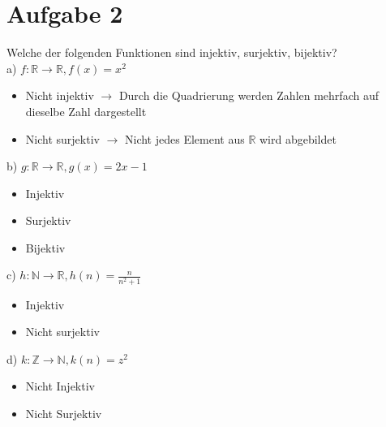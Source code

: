 \section*{Aufgabe 2}

Welche der folgenden Funktionen sind injektiv, surjektiv, bijektiv?\\

a) $f : \mathbb{R} \rightarrow \mathbb{R}, f(x) = x^2$

\begin{itemize}
\item Nicht injektiv $\rightarrow$ Durch die Quadrierung werden Zahlen mehrfach auf dieselbe Zahl dargestellt
\item Nicht surjektiv $\rightarrow$ Nicht jedes Element aus $\mathbb{R}$ wird abgebildet
\end{itemize}

b) $g: \mathbb{R} \rightarrow \mathbb{R}, g(x) = 2x - 1$

\begin{itemize}
\item Injektiv
\item Surjektiv
\item Bijektiv
\end{itemize}

c) $h: \mathbb{N} \rightarrow \mathbb{R}, h(n) = \frac{n}{n^2 + 1}$

\begin{itemize}
\item Injektiv
\item Nicht surjektiv
\end{itemize}

d) $k: \mathbb{Z} \rightarrow \mathbb{N}, k(n) = z^2$

\begin{itemize}
\item Nicht Injektiv
\item Nicht Surjektiv
\end{itemize}

\newpage
